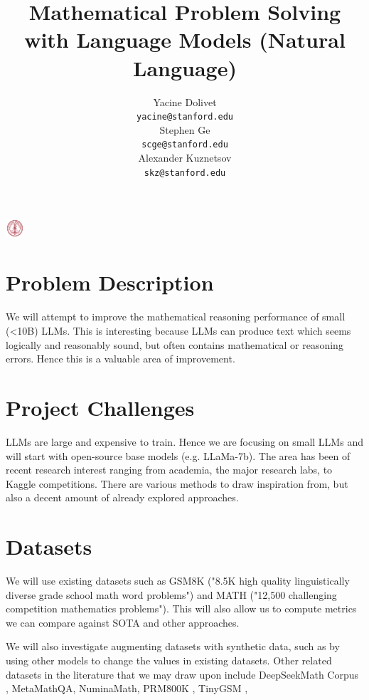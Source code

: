 \documentclass{article}
\title{Mathematical Problem Solving with Language Models (Natural Language)}
\author{
  Yacine Dolivet\\
  \texttt{yacine@stanford.edu} \\
  \And
  Stephen Ge\\
  \texttt{scge@stanford.edu} \\
   \And
  Alexander Kuznetsov\\
  \texttt{skz@stanford.edu} \\
}
\begin{document}

\begin{center}
\includegraphics[width=0.7cm, height=0.7cm]{stanford.png}
\end{center}

\maketitle

\section{Problem Description}	
We will attempt to improve the mathematical reasoning performance of small (<10B) LLMs. This is interesting because LLMs can produce text which seems logically and reasonably sound, but often contains mathematical or reasoning errors. Hence this is a valuable area of improvement.


\section{Project Challenges}
LLMs are large and expensive to train. Hence we are focusing on small LLMs and will start with open-source base models (e.g. LLaMa-7b). The area has been of recent research interest ranging from academia, the major research labs, to Kaggle competitions. There are various methods to draw inspiration from, but also a decent amount of already explored approaches.

\section{Datasets}
We will use existing datasets such as GSM8K \cite{cobbe}("8.5K high quality linguistically diverse grade school math word problems") and MATH \cite{hendrycks} ("12,500 challenging
competition mathematics problems"). This will also allow us to compute metrics we can compare against SOTA and other approaches. 

We will also investigate augmenting datasets with synthetic data, such as by using other models to change the values in existing datasets. Other related datasets in the literature that we may draw upon include DeepSeekMath Corpus \cite{shao}, MetaMathQA, NuminaMath, PRM800K \cite{lightman}, TinyGSM \cite{liu}, 
\end{document}
